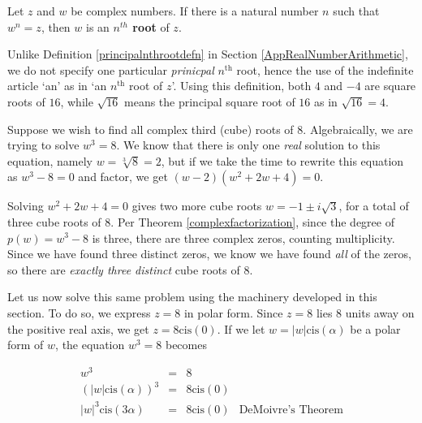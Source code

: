 \documentclass{ximera}
\begin{document}
 


\begin{definition} \label{nthrootcomplex} Let $z$ and $w$ be complex numbers.  If there is a natural number $n$ such that $w^{n} = z$, then $w$ is an \textbf{\boldmath $n^{th}$ root} of $z$.   


\end{definition}


 

Unlike Definition \ref{principalnthrootdefn} in Section \ref{AppRealNumberArithmetic}, we do not specify one particular \textit{prinicpal} $n^{\text{th}}$ root, hence the use of the indefinite article `an' as in `an $n^{\text{th}}$ root of $z$'.  Using this definition, both $4$ and $-4$ are square roots of $16$, while $\sqrt{16}$ means the principal square root of $16$ as in $\sqrt{16}= 4$.  

 

Suppose we wish to find all complex third (cube) roots of $8$.  Algebraically, we are trying to solve $w^{3} = 8$.  We know that there is only one \textit{real} solution to this equation, namely $w = \sqrt[3]{8} = 2$, but if we take the time to rewrite this equation as $w^3 - 8 = 0$ and factor, we get $(w-2)\left(w^2 + 2w + 4\right) = 0$.  

 

Solving $w^2 + 2w + 4=0$ gives two more cube roots $w = -1 \pm i \sqrt{3}$, for a total of three cube roots of $8$. Per Theorem \ref{complexfactorization}, since the degree of $p(w) = w^3 -8$ is three, there are three complex zeros, counting multiplicity.  Since we have found three distinct zeros, we know we have found \textit{all} of the zeros, so there are \textit{exactly three distinct }cube roots of $8$.  

 

Let us now solve this same problem using the machinery developed in this section.  To do so, we express $z = 8$ in polar form. Since $z=8$ lies $8$ units away on the positive real axis, we get $z = 8 \text{cis}(0)$.  If we let $w = |w| \text{cis}(\alpha)$ be a polar form of $w$, the equation $w^3 = 8$ becomes

\[ \begin{array}{rcll}
w^3 & = & 8 & \\
\left(|w| \text{cis}(\alpha)\right)^3 & = & 8 \text{cis}(0) & \\
|w|^3 \text{cis}(3\alpha) & = & 8 \text{cis}(0) & \text{DeMoivre's Theorem} \\
\end{array}\]
\end{document}
